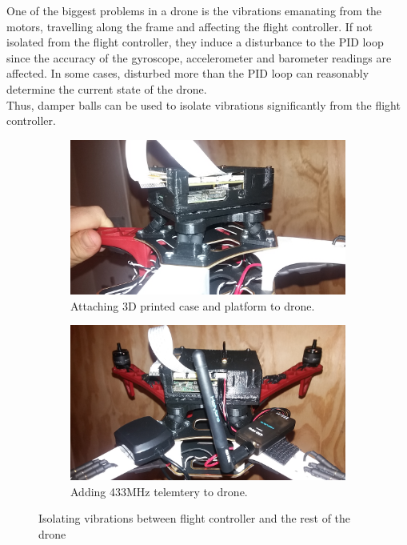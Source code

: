 One of the biggest problems in a drone is the vibrations emanating from the motors, travelling along the frame and affecting the flight controller. If not isolated from the flight controller, they induce a disturbance to the PID loop since the accuracy of the gyroscope, accelerometer and barometer readings are affected. In some cases, disturbed more than the PID loop can reasonably determine the current state of the drone.\\

Thus, damper balls can be used to isolate vibrations significantly from the flight controller.

\begin{figure}[H]
\begin{subfigure}{0.5\textwidth}
\centering
\includegraphics[scale=0.1]{images/drone-build-case-ondrone.jpg}
\caption{Attaching 3D printed case and platform to drone.}
\label{fig:attach_case_drone}
\end{subfigure}
\begin{subfigure}{0.5\textwidth}
\centering
\includegraphics[scale=0.1]{images/drone-build-433.jpg}
\caption{Adding 433MHz telemtery to drone.}
\label{fig:attach_433}
\end{subfigure}
\caption{Isolating vibrations between flight controller and the rest of the drone}
\label{fig:attach_case_433}
\end{figure}

